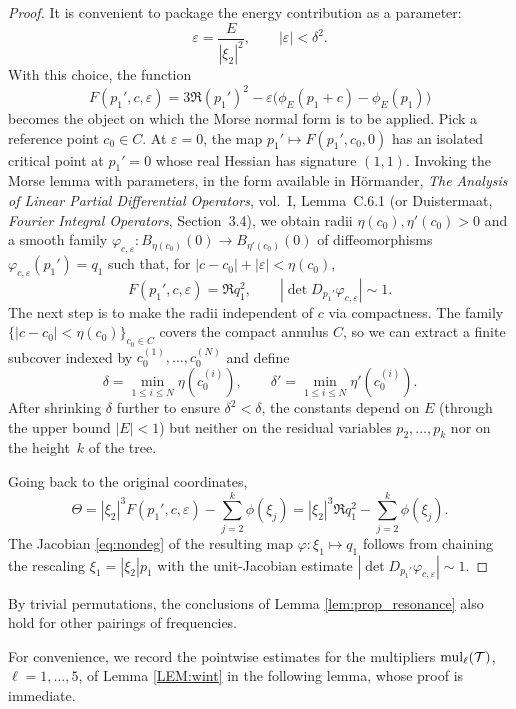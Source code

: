 \begin{proof}
It is convenient to package the energy contribution as a parameter:
$$
\varepsilon=\frac{E}{|\xi_2|^2},\qquad |\varepsilon|<\delta^2.
$$
With this choice, the function
$$
F(p_1', c, \varepsilon) = 3\Re (p_1')^2 - \varepsilon \bigl(\phi_E(p_1+c) - \phi_E(p_1)\bigr)
$$
becomes the object on which the Morse normal form is to be applied. Pick a reference point $c_0\in C$. At $\varepsilon=0$, the map $p_1'\mapsto F(p_1', c_0, 0)$ has an isolated critical point at $p_1'=0$ whose real Hessian has signature $(1,1)$. Invoking the Morse lemma with parameters, in the form available in H\"ormander, \emph{The Analysis of Linear Partial Differential Operators}, vol.~I, Lemma~C.6.1 (or Duistermaat, \emph{Fourier Integral Operators}, Section~3.4), we obtain radii $\eta(c_0),\eta'(c_0)>0$ and a smooth family $\varphi_{c,\varepsilon}:B_{\eta(c_0)}(0)\to B_{\eta'(c_0)}(0)$ of diffeomorphisms $\varphi_{c,\varepsilon}(p_1')=q_1$ such that, for $|c-c_0|+|\varepsilon|<\eta(c_0)$,
$$
F(p_1', c, \varepsilon) = \Re q_1^2,\qquad |\det D_{p_1'}\varphi_{c,\varepsilon}|\sim 1.
$$
The next step is to make the radii independent of $c$ via compactness. The family $\{|c-c_0|<\eta(c_0)\}_{c_0\in C}$ covers the compact annulus $C$, so we can extract a finite subcover indexed by $c_0^{(1)},\dots,c_0^{(N)}$ and define
$$
\delta=\min_{1\le i\le N}\eta(c_0^{(i)}),\qquad \delta'=\min_{1\le i\le N}\eta'(c_0^{(i)}).
$$
After shrinking $\delta$ further to ensure $\delta^2<\delta$, the constants depend on $E$ (through the upper bound $|E|<1$) but neither on the residual variables $p_2,\dots,p_k$ nor on the height~$k$ of the tree.

Going back to the original coordinates,
$$
\Theta = |\xi_2|^3 F\left(p_1', c, \varepsilon\right) - \sum_{j=2}^k \phi(\xi_j) =  |\xi_2|^3\Re q_1^2 - \sum_{j=2}^k \phi(\xi_j).
$$
The Jacobian \eqref{eq:nondeg} of the resulting map $\varphi:\xi_1\mapsto q_1$ follows from chaining the rescaling $\xi_1=|\xi_2|p_1$ with the unit-Jacobian estimate $|\det D_{p_1'}\varphi_{c,\varepsilon}|\sim 1$.
\end{proof}

\begin{remark}
By trivial permutations, the conclusions of Lemma \ref{lem:prop_resonance} also hold for other pairings of frequencies.
\end{remark}

For convenience, we record the pointwise estimates for the multipliers $\operatorname{mul}_\ell(\mathcal{T})$, $\ell=1,\dots,5$, of Lemma \ref{LEM:wint} in the following lemma, whose proof is immediate.

